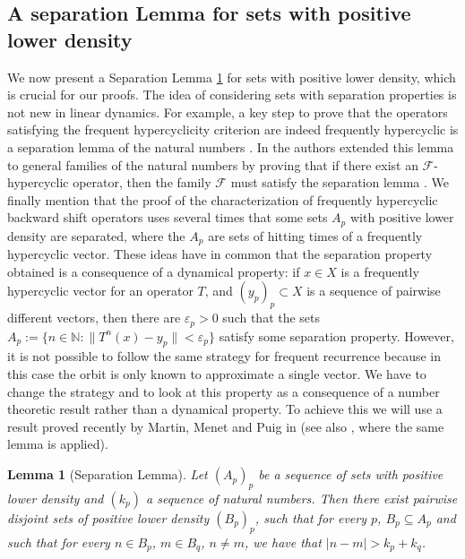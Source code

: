 \documentclass[11pt]{amsart}
\newtheorem{lemma}[theorem]{Lemma}
\newcommand{\sub}{\subseteq}
\newcommand{\F}{\mathcal {F}}
\begin{document}
\subsection{A separation Lemma for sets with positive lower density}\label{seccion separation lemma}
We now present a Separation Lemma \ref{separation lemma} for sets with positive lower density, which is crucial for our proofs. The idea of considering sets with separation properties is not new in linear dynamics. For example, a key step to prove that the operators satisfying the frequent hypercyclicity criterion are indeed frequently hypercyclic is a separation lemma of the natural numbers \cite[Lemma 2.2]{BayGri06}. In \cite[Proposition 1]{Bes16} the authors extended this lemma to general families of the natural numbers by proving that if there exist an $\F$-hypercyclic operator, then the family $\F$ must satisfy the separation lemma \cite[Lemma 2.2]{BayGri06}. We finally mention that the proof of the characterization of frequently hypercyclic backward shift operators \cite{BonGro18} uses several times that some sets $A_p$ with positive lower density are separated, where the $A_p$ are sets of hitting times of a frequently hypercyclic vector. 
These ideas have in common that  the separation property obtained is a consequence of a dynamical property: if $x\in X$ is a frequently hypercyclic vector for an operator $T$, and $(y_p)_p\subset X$ is a sequence of pairwise different vectors, then there are $\varepsilon_p>0$ such that the sets $A_p:=\{n\in\mathbb N:\|T^n(x)-y_p\|<\varepsilon_p\}$ satisfy some separation property. However, it is not possible to follow the same strategy for frequent recurrence because in this case the orbit is only known to  approximate a single vector. We have to change the strategy and to look at this property as a consequence of a number theoretic result rather than a dynamical property. To achieve this we will use a result proved recently by Martin, Menet and Puig in \cite{MarMenPui22} (see also \cite{BayGriMatMen24}, where the same lemma is applied).
\begin{lemma}[Separation Lemma]\label{separation lemma}
Let $(A_p)_p$ be a sequence of sets with positive lower density and $(k_p)$ a sequence of natural numbers. Then there exist pairwise disjoint sets of positive lower density $(B_p)_p$, such that for every $p$, $B_p\sub A_p$ and such that for every $n\in B_p$, $m\in B_q$, $n\ne m$, we have that $|n-m|>k_p+k_q$.
\end{lemma}

\end{document}
